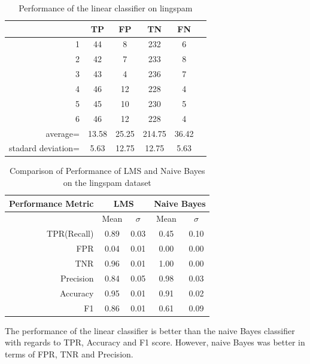 \documentclass[12pt]{article}
\begin{document}
\begin{table}[H]
  \centering
  \label{tab:spam_filter}
  \caption{Performance of the linear classifier on lingspam}
  \begin{tabular}{r|c|c|c|c|c}
  & \textbf{TP} & \textbf{FP} & \textbf{TN} & \textbf{FN} \\
  \hline
  1&44&8&232&6\\
  2&42&7&233&8\\
  3&43&4&236&7\\
  4&46&12&228&4\\
  5&45&10&230&5\\
  6&46&12&228&4\\
  \hline
  average=&13.58&25.25&214.75&36.42\\
  \hline
  stadard deviation=&5.63&12.75&12.75&5.63
  \end{tabular}
\end{table}

\begin{table}[H]
  \centering
  \label{tab:spam_filter_comparison}
  \caption{Comparison of Performance of LMS and Naive Bayes on the lingspam dataset}
  \begin{tabular}{r||cc|cc}
    \textbf{Performance Metric} & \multicolumn{2}{|c|}{\textbf{LMS}} & \multicolumn{2}{c}{\textbf{Naive Bayes}} \\
    \hline
    & Mean & $\sigma$ & Mean & $\sigma$ \\
    \hline
    TPR(Recall)&0.89&0.03&0.45&0.10\\
    FPR&0.04&0.01&0.00&0.00\\
    TNR&0.96&0.01&1.00&0.00\\
    Precision&0.84&0.05&0.98&0.03\\
    Accuracy&0.95&0.01&0.91&0.02\\
    F1&0.86&0.01&0.61&0.09\\
  \end{tabular}
\end{table}

The performance of the linear classifier is better than the naive Bayes classifier with regards to TPR, Accuracy and F1 score. However, naive Bayes was better in terms of FPR, TNR and Precision.
\end{document}
